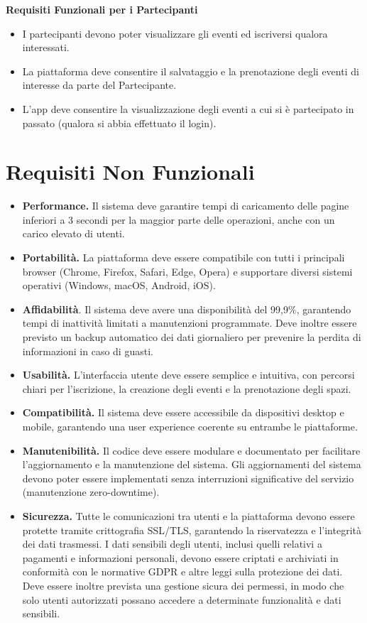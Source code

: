 \documentclass[9pt]{extarticle}
\begin{document}
\textbf{Requisiti Funzionali per i Partecipanti}
\begin{itemize}
	\item \FR I partecipanti devono poter visualizzare gli eventi ed iscriversi qualora interessati.
	\item \FR La piattaforma deve consentire il salvataggio e la prenotazione degli eventi di interesse da parte del Partecipante.
	\item \FR L'app deve consentire la visualizzazione degli eventi a cui si è partecipato in passato (qualora si abbia effettuato il login).
\end{itemize}

\section{Requisiti Non Funzionali}


\begin{itemize}
	\item \NONFUNC \textbf{Performance.} Il sistema deve garantire tempi di caricamento delle pagine inferiori a 3 secondi per la maggior parte delle operazioni, anche con un carico elevato di utenti.
	\item \NONFUNC \textbf{Portabilità.} La piattaforma deve essere compatibile con tutti i principali browser (Chrome, Firefox, Safari, Edge, Opera) e supportare diversi sistemi operativi (Windows, macOS, Android, iOS).
	\item \NONFUNC\textbf{Affidabilità}. Il sistema deve avere una disponibilità del 99,9\%, garantendo tempi di inattività limitati a manutenzioni programmate. Deve inoltre essere previsto un backup automatico dei dati giornaliero per prevenire la perdita di informazioni in caso di guasti.
	\item \NONFUNC\textbf{Usabilità.} L’interfaccia utente deve essere semplice e intuitiva, con percorsi chiari per l’iscrizione, la creazione degli eventi e la prenotazione degli spazi.
	
    \item \NONFUNC\textbf{Compatibilità.} Il sistema deve essere accessibile da dispositivi desktop e mobile, garantendo una user experience coerente su entrambe le piattaforme.
	\item \NONFUNC\textbf{Manutenibilità.} Il codice deve essere modulare e documentato per facilitare l'aggiornamento e la manutenzione del sistema. Gli aggiornamenti del sistema devono poter essere implementati senza interruzioni significative del servizio (manutenzione zero-downtime).
    \item \NONFUNC\textbf{Sicurezza.} Tutte le comunicazioni tra utenti e la piattaforma devono essere protette tramite crittografia SSL/TLS, garantendo la riservatezza e l’integrità dei dati trasmessi. I dati sensibili degli utenti, inclusi quelli relativi a pagamenti e informazioni personali, devono essere criptati e archiviati in conformità con le normative GDPR e altre leggi sulla protezione dei dati. Deve essere inoltre prevista una gestione sicura dei permessi, in modo che solo utenti autorizzati possano accedere a determinate funzionalità e dati sensibili.
\end{itemize}
\end{document}
